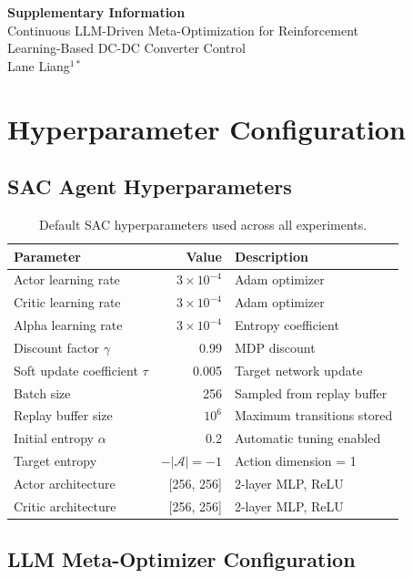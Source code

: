 \documentclass[11pt]{article}
\begin{document}
\begin{center}
{\Large\textbf{Supplementary Information}}\\[0.5em]
{\large Continuous LLM-Driven Meta-Optimization for Reinforcement}\\
{\large Learning-Based DC-DC Converter Control}\\[1em]
Lane Liang$^{1*}$
\end{center}

\section{Hyperparameter Configuration}

\subsection{SAC Agent Hyperparameters}

\begin{table}[h]
\centering
\caption{Default SAC hyperparameters used across all experiments.}
\begin{tabular}{lrl}
\toprule
\textbf{Parameter} & \textbf{Value} & \textbf{Description} \\
\midrule
Actor learning rate & $3\times10^{-4}$ & Adam optimizer \\
Critic learning rate & $3\times10^{-4}$ & Adam optimizer \\
Alpha learning rate & $3\times10^{-4}$ & Entropy coefficient \\
Discount factor $\gamma$ & 0.99 & MDP discount \\
Soft update coefficient $\tau$ & 0.005 & Target network update \\
Batch size & 256 & Sampled from replay buffer \\
Replay buffer size & $10^6$ & Maximum transitions stored \\
Initial entropy $\alpha$ & 0.2 & Automatic tuning enabled \\
Target entropy & $-|\mathcal{A}| = -1$ & Action dimension = 1 \\
Actor architecture & [256, 256] & 2-layer MLP, ReLU \\
Critic architecture & [256, 256] & 2-layer MLP, ReLU \\
\bottomrule
\end{tabular}
\end{table}

\subsection{LLM Meta-Optimizer Configuration}
\end{document}
